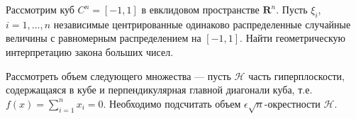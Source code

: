 \begin{problem}
Рассмотрим куб $C^n = [-1,1]$ в евклидовом пространстве $\mathbf{R}^n$. Пусть $\xi_i$, $i=1,\dots,n$ независимые центрированные одинаково распределенные случайные величины с равномерным распределением на $[-1,1]$. Найти геометрическую интерпретацию закона больших чисел.
\end{problem}

\begin{remark} 
Рассмотреть объем  следующего множества ---   пусть $\mathcal{H}$ часть гиперплоскости, содержащаяся в кубе и перпендикулярная главной диагонали куба, т.е.  $f(x) =\sum_{i=1}^n x_i = 0$. Необходимо подсчитать объем $\epsilon\sqrt{n}$-окрестности $\mathcal{H}$. 
\end{remark}

